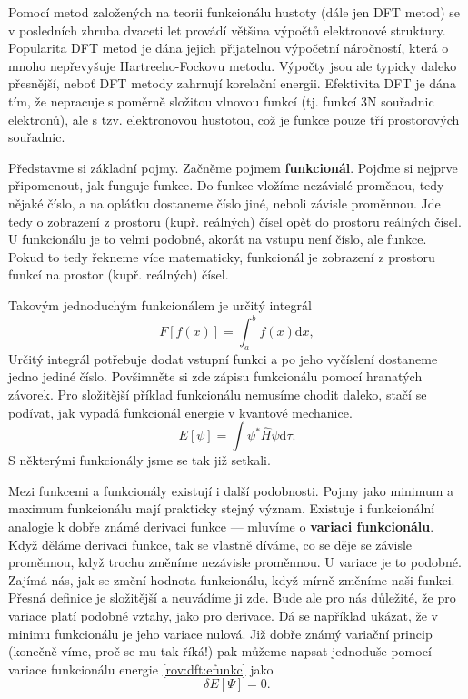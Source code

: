 Pomocí metod založených na teorii funkcionálu hustoty (dále jen DFT metod) se v posledních zhruba dvaceti let provádí většina výpočtů elektronové struktury. Popularita DFT metod je dána jejich přijatelnou výpočetní náročností, která o mnoho nepřevyšuje Hartreeho-Fockovu 
metodu. Výpočty jsou ale typicky daleko přesnější, neboť DFT metody zahrnují korelační energii. Efektivita DFT je dána tím, že nepracuje s poměrně složitou vlnovou funkcí (tj. funkcí 3N souřadnic elektronů), ale s tzv. elektronovou hustotou, což je funkce pouze tří prostorových souřadnic. 

Představme si základní pojmy. Začněme pojmem \textbf{funkcionál}. Pojďme si nejprve připomenout, jak funguje funkce. Do funkce vložíme nezávislé proměnou, tedy nějaké číslo, a na oplátku dostaneme číslo jiné, neboli závisle proměnnou. Jde tedy o zobrazení z prostoru  (kupř. reálných) čísel opět do prostoru reálných čísel. U funkcionálu je to velmi podobné, akorát na vstupu není číslo, ale funkce. Pokud to tedy řekneme více matematicky, funkcionál je zobrazení z prostoru funkcí na prostor (kupř. reálných) čísel.

Takovým jednoduchým funkcionálem je určitý integrál
$$
F[f(x)] = \int_a^b f(x) \mathrm{d}x, 
$$
Určitý integrál potřebuje dodat vstupní funkci a po jeho vyčíslení dostaneme jedno jediné číslo. Povšimněte si zde zápisu funkcionálu pomocí hranatých závorek.  
Pro složitější příklad funkcionálu nemusíme chodit daleko, stačí se podívat, jak vypadá funkcionál energie v kvantové mechanice.
$$
E[\psi] = \int \psi^*\hat{H}\psi \mathrm{d}\tau .
\label{rov:dft:efunkc}
$$
S některými funkcionály jsme se tak již setkali.

Mezi funkcemi a funkcionály existují i další podobnosti. Pojmy jako minimum a maximum funkcionálu mají prakticky stejný význam. Existuje i funkcionální analogie k dobře známé derivaci funkce --- mluvíme o \textbf{variaci funkcionálu}.
Když děláme derivaci funkce, tak se vlastně díváme, co se děje se závisle proměnnou, když trochu změníme nezávisle proměnnou.
U variace je to podobné. Zajímá nás, jak se změní hodnota funkcionálu, když mírně změníme naši funkci. Přesná definice je složitější a neuvádíme ji zde. Bude ale pro nás důležité, že pro variace platí podobné vztahy, jako pro derivace. Dá se například ukázat, že v minimu funkcionálu je jeho variace nulová. Již dobře známý variační princip (konečně víme, proč se mu tak říká!) pak můžeme napsat jednoduše pomocí variace funkcionálu energie \eqref{rov:dft:efunkc} jako
$$
\delta E[\Psi] = 0 .
$$

